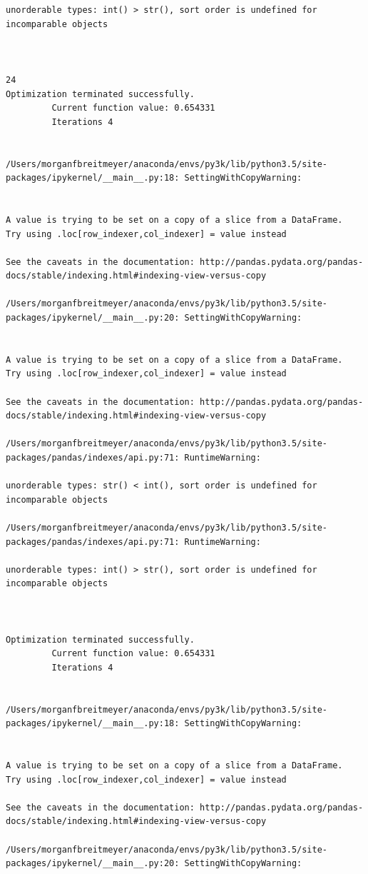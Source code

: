 \begin{lstlisting}
unorderable types: int() > str(), sort order is undefined for incomparable objects



24
Optimization terminated successfully.
         Current function value: 0.654331
         Iterations 4


/Users/morganfbreitmeyer/anaconda/envs/py3k/lib/python3.5/site-packages/ipykernel/__main__.py:18: SettingWithCopyWarning:


A value is trying to be set on a copy of a slice from a DataFrame.
Try using .loc[row_indexer,col_indexer] = value instead

See the caveats in the documentation: http://pandas.pydata.org/pandas-docs/stable/indexing.html#indexing-view-versus-copy

/Users/morganfbreitmeyer/anaconda/envs/py3k/lib/python3.5/site-packages/ipykernel/__main__.py:20: SettingWithCopyWarning:


A value is trying to be set on a copy of a slice from a DataFrame.
Try using .loc[row_indexer,col_indexer] = value instead

See the caveats in the documentation: http://pandas.pydata.org/pandas-docs/stable/indexing.html#indexing-view-versus-copy

/Users/morganfbreitmeyer/anaconda/envs/py3k/lib/python3.5/site-packages/pandas/indexes/api.py:71: RuntimeWarning:

unorderable types: str() < int(), sort order is undefined for incomparable objects

/Users/morganfbreitmeyer/anaconda/envs/py3k/lib/python3.5/site-packages/pandas/indexes/api.py:71: RuntimeWarning:

unorderable types: int() > str(), sort order is undefined for incomparable objects



Optimization terminated successfully.
         Current function value: 0.654331
         Iterations 4


/Users/morganfbreitmeyer/anaconda/envs/py3k/lib/python3.5/site-packages/ipykernel/__main__.py:18: SettingWithCopyWarning:


A value is trying to be set on a copy of a slice from a DataFrame.
Try using .loc[row_indexer,col_indexer] = value instead

See the caveats in the documentation: http://pandas.pydata.org/pandas-docs/stable/indexing.html#indexing-view-versus-copy

/Users/morganfbreitmeyer/anaconda/envs/py3k/lib/python3.5/site-packages/ipykernel/__main__.py:20: SettingWithCopyWarning:



\end{lstlisting}
